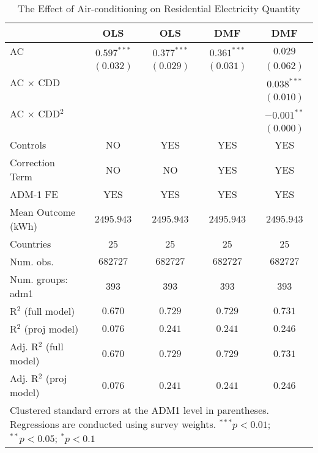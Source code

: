 
\begin{table}[htbp]
\caption{The Effect of Air-conditioning on Residential Electricity Quantity}
\begin{center}
\begin{tabular}{l c c c c}
\hline
 & OLS & OLS & DMF & DMF \\
\hline
AC                      & $0.597^{***}$ & $0.377^{***}$ & $0.361^{***}$ & $0.029$       \\
                        & $(0.032)$     & $(0.029)$     & $(0.031)$     & $(0.062)$     \\
AC $\times$ CDD         &               &               &               & $0.038^{***}$ \\
                        &               &               &               & $(0.010)$     \\
AC $\times$ CDD$^2$     &               &               &               & $-0.001^{**}$ \\
                        &               &               &               & $(0.000)$     \\
\hline
Controls                & NO            & YES           & YES           & YES           \\
Correction Term         & NO            & NO            & YES           & YES           \\
ADM-1 FE                & YES           & YES           & YES           & YES           \\
Mean Outcome (kWh)      & $2495.943$    & $2495.943$    & $2495.943$    & $2495.943$    \\
Countries               & 25            & 25            & 25            & 25            \\
Num. obs.               & $682727$      & $682727$      & $682727$      & $682727$      \\
Num. groups: adm1       & $393$         & $393$         & $393$         & $393$         \\
R$^2$ (full model)      & $0.670$       & $0.729$       & $0.729$       & $0.731$       \\
R$^2$ (proj model)      & $0.076$       & $0.241$       & $0.241$       & $0.246$       \\
Adj. R$^2$ (full model) & $0.670$       & $0.729$       & $0.729$       & $0.731$       \\
Adj. R$^2$ (proj model) & $0.076$       & $0.241$       & $0.241$       & $0.246$       \\
\hline
\multicolumn{5}{l}{\scriptsize{Clustered standard errors at the ADM1 level in parentheses. Regressions are conducted using survey weights. $^{***}p<0.01$; $^{**}p<0.05$; $^{*}p<0.1$}}
\end{tabular}
\label{main: ely_global}
\end{center}
\end{table}
